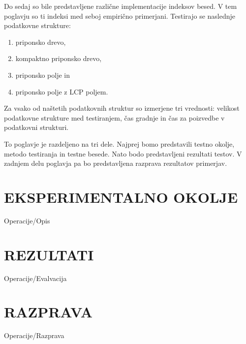 Do sedaj so bile predstavljene različne implementacije indeksov besed. V tem poglavju so ti indeksi med seboj empirično primerjani. Testirajo se naslednje podatkovne strukture:
\begin{enumerate}
        \item priponsko drevo, %
        \item kompaktno priponsko drevo, 
        \item priponsko polje in 
        \item priponsko polje z LCP poljem.
\end{enumerate}
Za vsako od naštetih podatkovnih struktur so izmerjene tri vrednosti: velikost podatkovne strukture med testiranjem, čas gradnje in čas za poizvedbe v podatkovni strukturi.

To poglavje je razdeljeno na tri dele. Najprej bomo predstavili testno okolje, metodo testiranja in testne besede. Nato bodo predstavljeni rezultati testov. V zadnjem delu poglavja pa bo predstavljena razprava rezultatov primerjav.

\section{EKSPERIMENTALNO OKOLJE}\label{sec:opis}
{Operacije/Opis}


\section{REZULTATI}\label{sec:primerjava}
{Operacije/Evalvacija}

\section{RAZPRAVA}\label{sec:razprava}
{Operacije/Razprava}